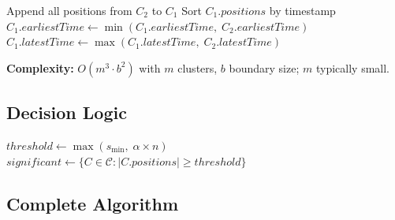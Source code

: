 \begin{algorithm}[H]
\caption{MergeClusters}
\label{alg:merge_two}
\BlankLine
Append all positions from $C_2$ to $C_1$\;
Sort $C_1.\mathit{positions}$ by timestamp\;
$C_1.\mathit{earliestTime} \leftarrow \min(C_1.\mathit{earliestTime},\; C_2.\mathit{earliestTime})$\;
$C_1.\mathit{latestTime} \leftarrow \max(C_1.\mathit{latestTime},\; C_2.\mathit{latestTime})$\;
\end{algorithm}
\vspace{1em}

\textbf{Complexity:} $O(m^3 \cdot b^2)$ with $m$ clusters, $b$ boundary size; $m$ typically small.

\subsection{Decision Logic}

\begin{algorithm}[H]
\caption{MakeDecision}
\label{alg:decision}
\BlankLine
{}
$\mathit{threshold} \leftarrow \max(s_{\min},\; \alpha \times n)$\;
$\mathit{significant} \leftarrow \{C \in \mathcal{C} : |C.\mathit{positions}| \geq \mathit{threshold}\}$\;
\end{algorithm}
\vspace{1em}

\subsection{Complete Algorithm}


